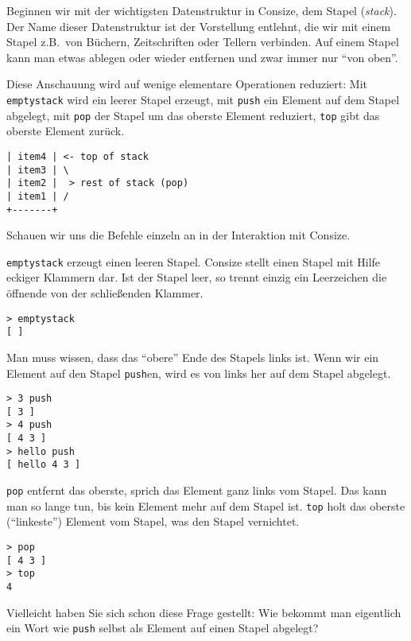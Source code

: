 Beginnen wir mit der wichtigsten Datenstruktur in Consize, dem Stapel (\emph{stack}). Der Name dieser Datenstruktur ist der Vorstellung entlehnt, die wir mit einem Stapel z.B.\ von Büchern, Zeitschriften oder Tellern verbinden. Auf einem Stapel kann man etwas ablegen oder wieder entfernen und zwar immer nur "`von oben"'.

Diese Anschauung wird auf wenige elementare Operationen reduziert: Mit \verb|emptystack| wird ein leerer Stapel erzeugt, mit \verb|push| ein Element auf dem Stapel abgelegt, mit \verb|pop| der Stapel um das oberste Element reduziert, \verb|top| gibt das oberste Element zurück.

\begin{verbatim}
| item4 | <- top of stack
| item3 | \
| item2 |  > rest of stack (pop)
| item1 | /
+-------+
\end{verbatim}

Schauen wir uns die Befehle einzeln an in der Interaktion mit Consize.


\verb|emptystack| erzeugt einen leeren Stapel. Consize stellt einen Stapel mit Hilfe eckiger Klammern dar. Ist der Stapel leer, so trennt einzig ein Leerzeichen die öffnende von der schließenden Klammer.

\begin{verbatim}
> emptystack
[ ]
\end{verbatim}

Man muss wissen, dass das "`obere"' Ende des Stapels links ist. Wenn wir ein Element auf den Stapel \verb|push|en, wird es von links her auf dem Stapel abgelegt.

\begin{verbatim}
> 3 push
[ 3 ]
> 4 push
[ 4 3 ]
> hello push
[ hello 4 3 ]
\end{verbatim}

\verb|pop| entfernt das oberste, sprich das Element ganz links vom Stapel. Das kann man so lange tun, bis kein Element mehr auf dem Stapel ist. \verb|top| holt das oberste ("`linkeste"') Element vom Stapel, was den Stapel vernichtet.

\begin{verbatim}
> pop
[ 4 3 ]
> top
4
\end{verbatim}

Vielleicht haben Sie sich schon diese Frage gestellt: Wie bekommt man eigentlich ein Wort wie \verb|push| selbst als Element auf einen Stapel abgelegt?

